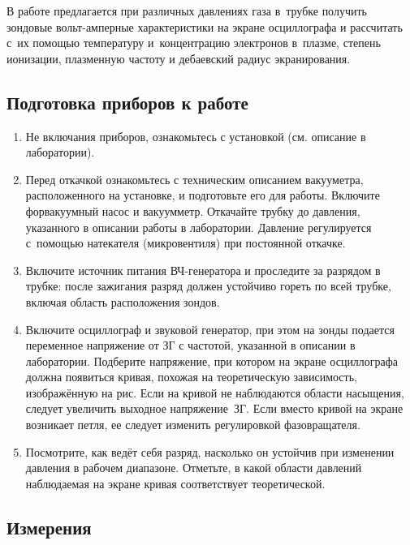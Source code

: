 \begin{lab:task}

В работе предлагается при различных давлениях газа в~трубке получить зондовые вольт-амперные характеристики на экране
осциллографа и рассчитать с~их помощью температуру и~концентрацию электронов в~плазме, степень ионизации, плазменную
частоту и дебаевский радиус экранирования.

\subsection*{Подготовка приборов к работе}

\begin{enumerate}
\item Не включания приборов, ознакомьтесь с установкой (см. описание в лаборатории). 

\item Перед откачкой ознакомьтесь с техническим описанием вакууметра, расположенного на установке, и подготовьте его для работы. Включите форвакуумный насос и вакуумметр. Откачайте трубку до давления, указанного в описании работы в лаборатории. Давление
регулируется с~помощью натекателя (микровентиля) при постоянной откачке.

\item Включите источник питания ВЧ-генератора и проследите за разрядом в трубке: после зажигания разряд должен устойчиво
гореть по всей трубке, включая область расположения зондов.


\item  Включите осциллограф и звуковой генератор, при этом на зонды подается переменное напряжение от ЗГ с частотой, указанной в описании в лаборатории. Подберите напряжение, при котором на экране осциллографа должна появиться кривая, похожая на теоретическую зависимость, изображённую на рис. %
Если на кривой не наблюдаются области насыщения, следует увеличить выходное напряжение~ЗГ. Если вместо кривой на экране
возникает петля, ее следует изменить регулировкой фазовращателя.

\item Посмотрите, как ведёт себя разряд, насколько он устойчив при изменении давления в
рабочем диапазоне. Отметьте, в какой области давлений наблюдаемая на экране кривая соответствует
теоретической.
\end{enumerate}

\subsection*{Измерения}


\end{lab:task}
